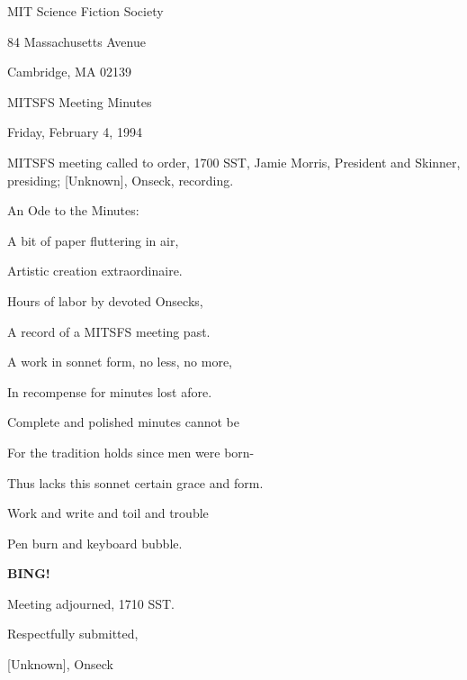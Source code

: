 \documentclass[12pt]{article}
\newcommand{\bing}{{\bf BING!} }
\begin{document}
\begin{center}

MIT Science Fiction Society 

84 Massachusetts Avenue

Cambridge, MA 02139

\vspace{12pt}

MITSFS Meeting Minutes 

Friday, February 4, 1994

\end{center}
 
\vspace{18pt}

\setlength{\parskip}{6pt}

\noindent
MITSFS meeting called to order, 1700 SST,
Jamie Morris, President and Skinner, presiding; [Unknown], Onseck, recording.

An Ode to the Minutes:

A bit of paper fluttering in air,

Artistic creation extraordinaire.

Hours of labor by devoted Onsecks,

A record of a MITSFS meeting past.

A work in sonnet form, no less, no more,

In recompense for minutes lost afore.

Complete and polished minutes cannot be

For the tradition holds since men were born-

Thus lacks this sonnet certain grace and form.

Work and write and toil and trouble

Pen burn and keyboard bubble.

\bing

\vspace{12pt}

\noindent
Meeting adjourned, 1710 SST.

\vspace{18pt}

\centerline{Respectfully submitted,}
\centerline{[Unknown], Onseck}
\end{document}
